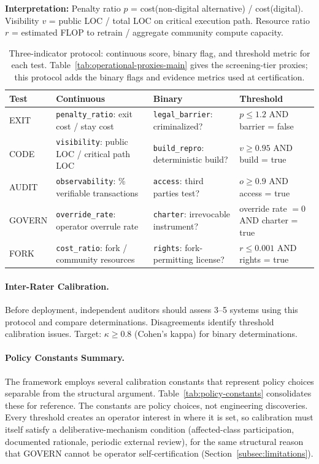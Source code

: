 \documentclass{article}
\begin{document}
\textbf{Interpretation:} Penalty ratio $p$ = cost(non-digital alternative) / cost(digital). Visibility $v$ = public LOC / total LOC on critical execution path. Resource ratio $r$ = estimated FLOP to retrain / aggregate community compute capacity.

\begin{table}[htbp]
\centering
\scriptsize
\caption{Three-indicator protocol: continuous score, binary flag, and threshold metric for each test. Table~\ref{tab:operational-proxies-main} gives the screening-tier proxies; this protocol adds the binary flags and evidence metrics used at certification.}
\label{tab:three-indicator-main}
\begin{tabular}{@{}lp{2.8cm}p{2.8cm}p{3.2cm}@{}}
\toprule
\textbf{Test} & \textbf{Continuous} & \textbf{Binary} & \textbf{Threshold} \\
\midrule
EXIT & \texttt{penalty\_ratio}: exit cost / stay cost & \texttt{legal\_barrier}: criminalized? & $p \leq 1.2$ AND barrier = false \\
CODE & \texttt{visibility}: public LOC / critical path LOC & \texttt{build\_repro}: deterministic build? & $v \geq 0.95$ AND build = true \\
AUDIT & \texttt{observability}: \% verifiable transactions & \texttt{access}: third parties test? & $o \geq 0.9$ AND access = true \\
GOVERN & \texttt{override\_rate}: operator overrule rate & \texttt{charter}: irrevocable instrument? & override rate $= 0$ AND charter = true \\
FORK & \texttt{cost\_ratio}: fork / community resources & \texttt{rights}: fork-permitting license? & $r \leq 0.001$ AND rights = true \\
\bottomrule
\end{tabular}
\end{table}

\paragraph{Inter-Rater Calibration.} Before deployment, independent auditors should assess 3--5 systems using this protocol and compare determinations. Disagreements identify threshold calibration issues. Target: $\kappa \geq 0.8$ (Cohen's kappa) for binary determinations.

\paragraph{Policy Constants Summary.} The framework employs several calibration constants that represent policy choices separable from the structural argument. Table~\ref{tab:policy-constants} consolidates these for reference. The constants are policy choices, not engineering discoveries. Every threshold creates an operator interest in where it is set, so calibration must itself satisfy a deliberative-mechanism condition (affected-class participation, documented rationale, periodic external review), for the same structural reason that GOVERN cannot be operator self-certification (Section~\ref{subsec:limitations}).
\end{document}
